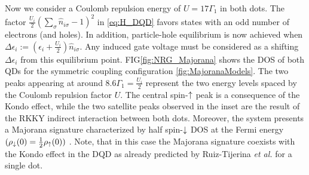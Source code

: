 Now we consider a Coulomb repulsion energy of $U = 17\Gamma_1$ in both dots. The factor $ \frac{U_i}{2}(\sum_{\sigma} \hat{n}_{i\sigma}-1)^{2}$ in \eqref{eq:H_DQD} favors states with an odd number of electrons (and holes). In addition, particle-hole equilibrium is now achieved when $\Delta \epsilon_{i} := \left(\epsilon_{i}+\frac{U_i}{2}\right)\hat{n}_{i\sigma}$.  Any induced gate voltage must be considered as a shifting $\Delta \epsilon_{i}$ from this equilibrium point. FIG\ref{fig:NRG_Majorana} shows the DOS of both QDs for the symmetric coupling configuration \ref{fig:MajoranaModels}. The two peaks appearing at around $8.6\Gamma_1 = \frac{U_i}{2}$ represent the two energy levels spaced by the Coulomb repulsion factor $U$. The central spin-$\uparrow$ peak is a consequence of the Kondo effect, \cite{hewson_kondo_1997,wilson_renormalization_1975}  while the two satellite peaks observed in the inset  are the result of the  RKKY indirect interaction between both dots.  \cite{ruderman_indirect_1954,kasuya_theory_1956,yosida_magnetic_1957} Moreover, the system presents a Majorana signature characterized by half spin-$\downarrow$ DOS at the Fermi energy $(\rho_\downarrow(0) = \frac{1}{2}\rho_\uparrow(0))$  . Note, that in this case the Majorana signature coexists with the Kondo effect in the DQD as already predicted by Ruiz-Tijerina \textit{et al.} for a single dot. \cite{ruiz-tijerina_interaction_2015}



